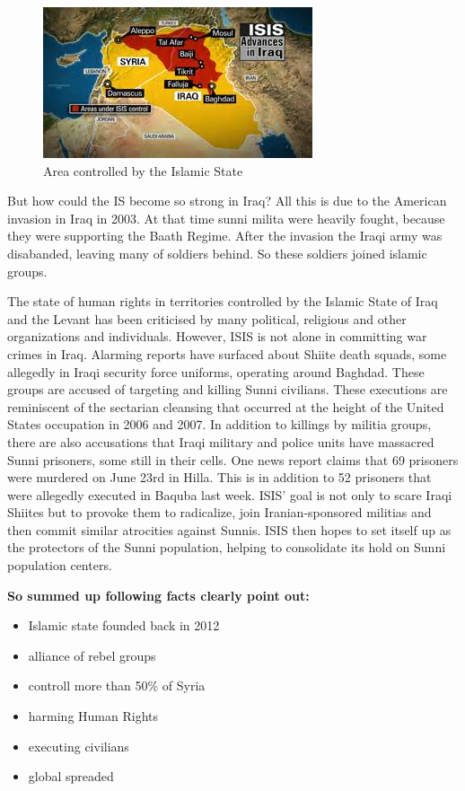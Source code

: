 \begin{figure}[!h]
	\begin{center}
		\includegraphics[width=0.5\linewidth]{images/ISIS_area}
		\caption{Area controlled by the Islamic State}
	\end{center}
\end{figure}

But how could the IS become so strong in Iraq? All this is due to the American invasion in Iraq in 2003. At that time sunni milita were heavily fought, because they were supporting the Baath Regime. After the invasion the Iraqi army was disabanded, leaving many of soldiers behind. So these soldiers joined islamic groups.

The state of human rights in territories controlled by the Islamic State of Iraq and the Levant has been criticised by many political, religious and other organizations and individuals. However, ISIS is not alone in committing war crimes in Iraq.  Alarming reports have surfaced about Shiite death squads, some allegedly in Iraqi security force uniforms, operating around Baghdad.  These groups are accused of targeting and killing Sunni civilians.  These executions are reminiscent of the sectarian cleansing that occurred at the height of the United States occupation in 2006 and 2007.  In addition to killings by militia groups, there are also accusations that Iraqi military and police units have massacred Sunni prisoners, some still in their cells.  One news report claims that 69 prisoners were murdered on June 23rd in Hilla.  This is in addition to 52 prisoners that were allegedly executed in Baquba last week.
ISIS’ goal is not only to scare Iraqi Shiites but to provoke them to radicalize, join Iranian-sponsored militias and then commit similar atrocities against Sunnis.  ISIS then hopes to set itself up as the protectors of the Sunni population, helping to consolidate its hold on Sunni population centers.


\textbf{So summed up following facts clearly point out:}
\begin{itemize}
	\item Islamic state founded back in 2012
	\item alliance of rebel groups
	\item controll more than 50\% of Syria
	\item harming Human Rights
	\item executing civilians
	\item global spreaded
\end{itemize}


